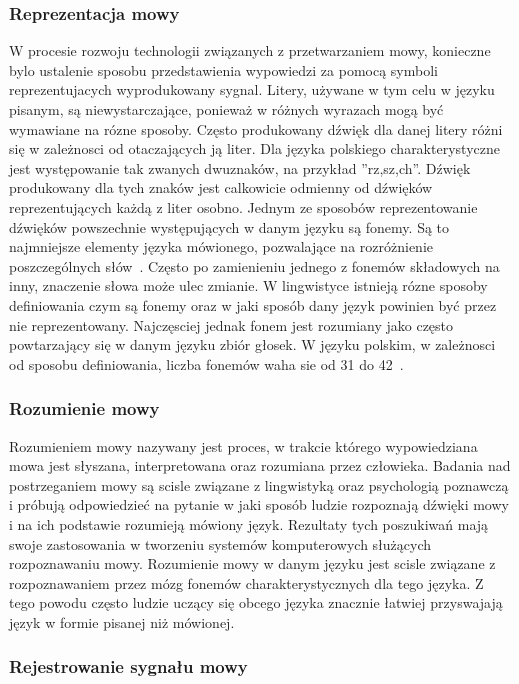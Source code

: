 \documentclass[a4paper,12 pt]{article}
\begin{document}
\subsubsection{Reprezentacja mowy}
W procesie rozwoju technologii związanych z  przetwarzaniem mowy, konieczne bylo ustalenie sposobu przedstawienia wypowiedzi za pomocą symboli reprezentujacych wyprodukowany sygnal. Litery, używane w tym celu w języku pisanym, są niewystarczające, ponieważ w różnych wyrazach mogą być wymawiane na rózne sposoby.  Często produkowany dźwięk dla danej litery różni się w zależnosci od otaczających ją liter. Dla języka polskiego charakterystyczne jest występowanie tak zwanych dwuznaków, na przykład ''rz,sz,ch''. Dźwięk produkowany dla tych znaków jest calkowicie odmienny od dźwięków reprezentujących każdą z liter osobno. 
Jednym ze sposobów reprezentowanie dźwięków powszechnie występujących w danym języku są fonemy. Są to najmniejsze elementy języka mówionego, pozwalające na rozróżnienie poszczególnych słów~\cite{phonem}. Często po zamienieniu jednego z fonemów składowych na inny, znaczenie słowa może ulec zmianie. W lingwistyce istnieją rózne sposoby definiowania czym są fonemy oraz w jaki sposób dany język powinien być przez nie reprezentowany. Najczęsciej jednak fonem jest rozumiany jako często powtarzający się w danym języku zbiór głosek. W języku polskim, w zależnosci od sposobu definiowania, liczba fonemów waha sie od 31 do 42~\cite{liczba_fonem}.
\subsubsection{Rozumienie mowy}
Rozumieniem mowy nazywany jest proces, w trakcie którego wypowiedziana mowa jest słyszana, interpretowana oraz rozumiana przez człowieka. Badania nad postrzeganiem mowy są scisle związane
z lingwistyką oraz psychologią poznawczą i próbują odpowiedzieć na pytanie w jaki sposób ludzie rozpoznają dźwięki mowy i na ich podstawie rozumieją mówiony język. Rezultaty tych poszukiwań mają swoje zastosowania w tworzeniu systemów komputerowych służących rozpoznawaniu mowy. Rozumienie mowy w danym języku jest scisle związane z rozpoznawaniem przez mózg fonemów charakterystycznych dla tego języka. Z tego powodu często ludzie uczący się obcego języka znacznie łatwiej przyswajają język w formie pisanej niż mówionej.
\subsubsection{Rejestrowanie sygnału mowy}
\end{document}
